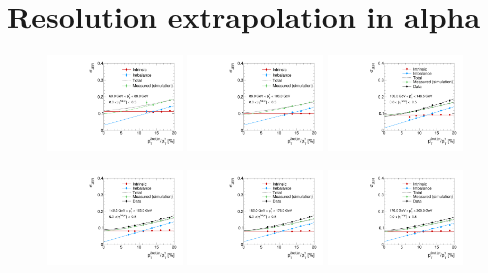 \section{Resolution extrapolation in alpha}
\label{res:app:extrapolationPlots}
\begin{figure}[!h]
 \centering
    \includegraphics[width=0.32\textwidth]{figures/resolution/results/JER_for_1_eta_bin_3_pTGamma_bin_all_contributions_PFCHS_RMS99_mc.pdf}
    \includegraphics[width=0.32\textwidth]{figures/resolution/results/JER_for_1_eta_bin_4_pTGamma_bin_all_contributions_PFCHS_RMS99_mc.pdf}
    \includegraphics[width=0.32\textwidth]{figures/resolution/results/JER_for_1_eta_bin_5_pTGamma_bin_all_contributions_PFCHS_RMS99_mc.pdf}

    \includegraphics[width=0.32\textwidth]{figures/resolution/results/JER_for_1_eta_bin_6_pTGamma_bin_all_contributions_PFCHS_RMS99_mc.pdf}
    \includegraphics[width=0.32\textwidth]{figures/resolution/results/JER_for_1_eta_bin_7_pTGamma_bin_all_contributions_PFCHS_RMS99_mc.pdf}
    \includegraphics[width=0.32\textwidth]{figures/resolution/results/JER_for_1_eta_bin_8_pTGamma_bin_all_contributions_PFCHS_RMS99_mc.pdf}


\end{figure}
